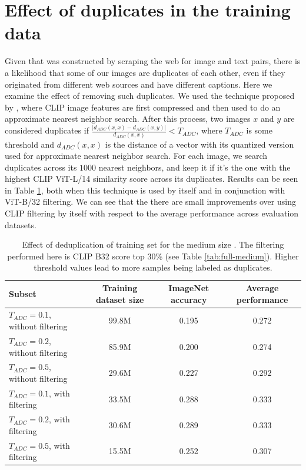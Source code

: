 \section{Effect of duplicates in the training data}
\label{app:dedup_training}

Given that \pool was constructed by scraping the web for image and text pairs, there is a likelihood that some of our images are duplicates of each other, even if they originated from different web sources and have different captions. Here we examine the effect of removing such duplicates. We used the technique proposed by \citet{webster2023deduplication}, where CLIP image features are first compressed and then used to do an approximate nearest neighbor search. After this process, two images $x$ and $y$ are considered duplicates if $\frac{|d_{ADC}(x,x) - d_{ADC}(x,y)|}{d_{ADC}(x,x)} < T_{ADC}$, where $T_{ADC}$ is some threshold and $d_{ADC}(x,x)$ is the distance of a vector with its quantized version used for approximate nearest neighbor search. For each image, we search duplicates across its $1000$ nearest neighbors, and keep it if it's the one with the highest CLIP ViT-L/14 similarity score across its duplicates. Results can be seen in Table \ref{tab:app_dedup_training}, both when this technique is used by itself and in conjunction with ViT-B/32 filtering. We can see that the there are small improvements over using CLIP filtering by itself with respect to the average performance across evaluation datasets.

\begin{table}
\caption{Effect of deduplication of training set for the medium size \pool. The filtering performed here is CLIP B32 score top 30\% (see Table \ref{tab:full-medium}). Higher threshold values lead to more samples being labeled as duplicates.}
\setlength\tabcolsep{4pt}
    \renewcommand{\arraystretch}{1.1}
\small
\centering
\begin{tabular}{lccc}
\toprule
Subset & Training dataset size & ImageNet accuracy & Average performance \\
\midrule
$T_{ADC} = 0.1$, without filtering & 99.8M & 0.195 & 0.272 \\
$T_{ADC} = 0.2$, without filtering & 85.9M & 0.200 & 0.274\\
$T_{ADC} = 0.5$, without filtering & 29.6M & 0.227 & 0.292\\
$T_{ADC} = 0.1$, with filtering & 33.5M & 0.288 & 0.333 \\
$T_{ADC} = 0.2$, with filtering & 30.6M & 0.289 & 0.333 \\
$T_{ADC} = 0.5$, with filtering & 15.5M & 0.252 & 0.307 \\
\bottomrule
\end{tabular}
\label{tab:app_dedup_training}
\end{table}


